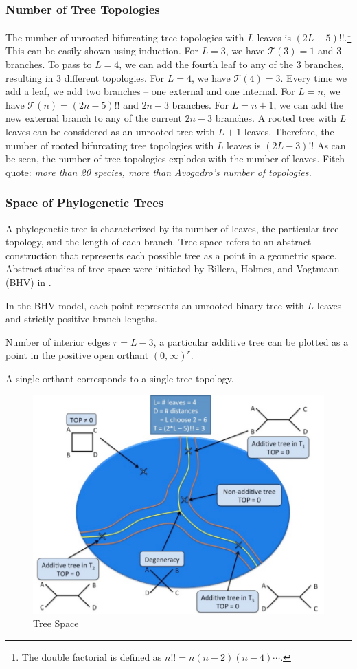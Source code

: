 \subsubsection{Number of Tree Topologies}

The number of unrooted bifurcating tree topologies with $L$ leaves is $(2L-5)!!$.\footnote{The double factorial is defined as $n!!=n(n-2)(n-4)\cdots$.}
This can be easily shown using induction.
For $L=3$, we have $\mathcal{T}(3)=1$ and $3$ branches.
To pass to $L=4$, we can add the fourth leaf to any of the $3$ branches, resulting in $3$ different topologies.
For $L=4$, we have $\mathcal{T}(4)=3$.
Every time we add a leaf, we add two branches -- one external and one internal.
For $L=n$, we have $\mathcal{T}(n)=(2n-5)!!$ and $2n-3$ branches.
For $L=n+1$, we can add the new external branch to any of the current $2n-3$ branches.
A rooted tree with $L$ leaves can be considered as an unrooted tree with $L+1$ leaves.
Therefore, the number of rooted bifurcating tree topologies with $L$ leaves is $(2L-3)!!$
As can be seen, the number of tree topologies explodes with the number of leaves.
Fitch quote: \emph{more than 20 species, more than Avogadro's number of topologies.}

\subsubsection{Space of Phylogenetic Trees}

A phylogenetic tree is characterized by its number of leaves, the particular tree topology, and the length of each branch.
Tree space refers to an abstract construction that represents each possible tree as a point in a geometric space.
Abstract studies of tree space were initiated by Billera, Holmes, and Vogtmann (BHV) in \cite{Billera:2001tv}.

In the BHV model, each point represents an unrooted binary tree with $L$ leaves and strictly positive branch lengths.

Number of interior edges $r=L-3$, a particular additive tree can be plotted as a point in the positive open orthant $(0,\infty)^{r}$.

A single orthant corresponds to a single tree topology.

\begin{figure}
\centering
\includegraphics[]{./fig/TreeSpace.pdf}
\caption{Tree Space}
\label{background:fig:TreeSpace}
\end{figure}

